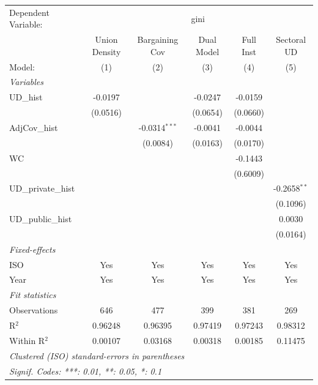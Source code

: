 
\begingroup
\centering
\begin{tabular}{lccccc}
   \tabularnewline \midrule \midrule
   Dependent Variable: & \multicolumn{5}{c}{gini}\\
                       & Union Density & Bargaining Cov  & Dual Model & Full Inst & Sectoral UD \\   
   Model:              & (1)           & (2)             & (3)        & (4)       & (5)\\  
   \midrule
   \emph{Variables}\\
   UD\_hist            & -0.0197       &                 & -0.0247    & -0.0159   &   \\   
                       & (0.0516)      &                 & (0.0654)   & (0.0660)  &   \\   
   AdjCov\_hist        &               & -0.0314$^{***}$ & -0.0041    & -0.0044   &   \\   
                       &               & (0.0084)        & (0.0163)   & (0.0170)  &   \\   
   WC                  &               &                 &            & -0.1443   &   \\   
                       &               &                 &            & (0.6009)  &   \\   
   UD\_private\_hist   &               &                 &            &           & -0.2658$^{**}$\\   
                       &               &                 &            &           & (0.1096)\\   
   UD\_public\_hist    &               &                 &            &           & 0.0030\\   
                       &               &                 &            &           & (0.0164)\\   
   \midrule
   \emph{Fixed-effects}\\
   ISO                 & Yes           & Yes             & Yes        & Yes       & Yes\\  
   Year                & Yes           & Yes             & Yes        & Yes       & Yes\\  
   \midrule
   \emph{Fit statistics}\\
   Observations        & 646           & 477             & 399        & 381       & 269\\  
   R$^2$               & 0.96248       & 0.96395         & 0.97419    & 0.97243   & 0.98312\\  
   Within R$^2$        & 0.00107       & 0.03168         & 0.00318    & 0.00185   & 0.11475\\  
   \midrule \midrule
   \multicolumn{6}{l}{\emph{Clustered (ISO) standard-errors in parentheses}}\\
   \multicolumn{6}{l}{\emph{Signif. Codes: ***: 0.01, **: 0.05, *: 0.1}}\\
\end{tabular}
\par\endgroup


